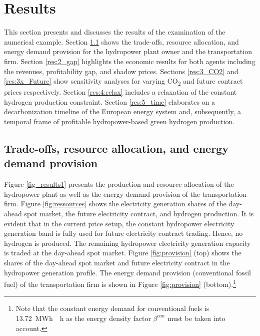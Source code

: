 \documentclass[review]{elsarticle}
\begin{document}
\section{Results}\label{results}
This section presents and discusses the results of the examination of the numerical example. Section \ref{res:1_tradeoffs} shows the trade-offs, resource allocation, and energy demand provision for the hydropower plant owner and the transportation firm. Section \ref{res:2_gap} highlights the economic results for both agents including the revenues, profitability gap, and shadow prices. Sections \ref{res:3_CO2} and \ref{res:3x_Future} show sensitivity analyses for varying CO\textsubscript{2} and future contract prices respectively. Section \ref{res:4:relax} includes a relaxation of the constant hydrogen production constraint. Section \ref{res:5_time} elaborates on a decarbonization timeline of the European energy system and, subsequently, a temporal frame of profitable hydropower-based green hydrogen production.

\subsection{Trade-offs, resource allocation, and energy demand provision}\label{res:1_tradeoffs}
Figure \ref{fig_results1} presents the production and resource allocation of the hydropower plant as well as the energy demand provision of the transportation firm. Figure \ref{fig:ressources} shows the electricity generation shares of the day-ahead spot market, the future electricity contract, and hydrogen production. It is evident that in the current price setup, the constant hydropower electricity generation band is fully used for future electricity contract trading. Hence, no hydrogen is produced. The remaining hydropower electricity generation capacity is traded at the day-ahead spot market. Figure \ref{fig:provision} (top) shows the shares of the day-ahead spot market and future electricity contract in the hydropower generation profile. The energy demand provision (conventional fossil fuel) of the transportation firm is shown in Figure \ref{fig:provision} (bottom).\footnote{Note that the constant energy demand for conventional fuels is \SI{13.72}{MWh \per \hour} as the energy density factor $\beta^{con}$ must be taken into account.}
\end{document}
